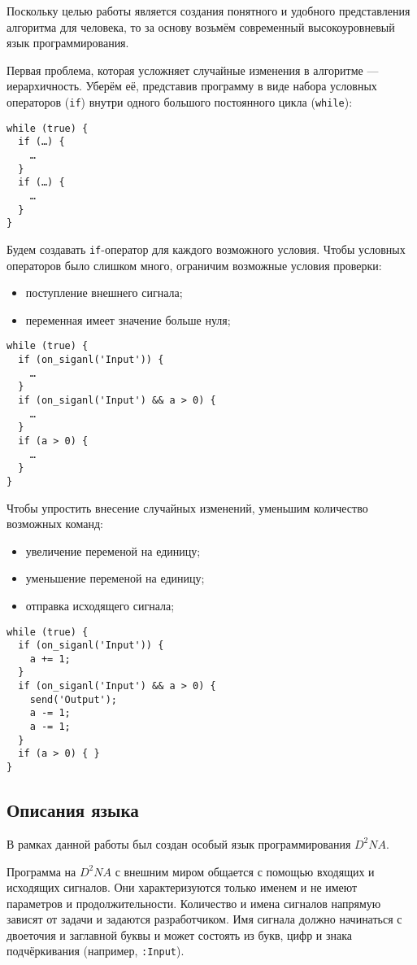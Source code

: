 \documentclass[utf8,a5paper,portrait,10pt,twoside]{eskdtext}
\begin{document}
Поскольку целью работы является создания понятного и удобного представления
алгоритма для человека, то за основу возьмём современный высокоуровневый язык
программирования.

Первая проблема, которая усложняет случайные изменения в алгоритме —
иерархичность. Уберём её, представив программу в виде набора
условных операторов (\texttt{if}) внутри одного большого постоянного цикла
(\texttt{while}):

\begin{verbatim}
while (true) {
  if (…) {
    …
  }
  if (…) {
    …
  }
}
\end{verbatim}

Будем создавать \texttt{if}-оператор для каждого возможного условия. Чтобы
условных операторов было слишком много, ограничим возможные условия проверки:
\begin{itemize}
  \item поступление внешнего сигнала;
  \item переменная имеет значение больше нуля;
\end{itemize}

\newpage
\begin{verbatim}
while (true) {
  if (on_siganl('Input')) {
    …
  }
  if (on_siganl('Input') && a > 0) {
    …
  }
  if (a > 0) {
    …
  }
}
\end{verbatim}

Чтобы упростить внесение случайных изменений, уменьшим количество возможных
команд:
\begin{itemize}
  \item увеличение переменой на единицу;
  \item уменьшение переменой на единицу;
  \item отправка исходящего сигнала;
\end{itemize}

\begin{verbatim}
while (true) {
  if (on_siganl('Input')) {
    a += 1;
  }
  if (on_siganl('Input') && a > 0) {
    send('Output');
    a -= 1;
    a -= 1;
  }
  if (a > 0) { }
}
\end{verbatim}

\subsection{Описания языка}

В рамках данной работы был создан особый язык программирования $D^2NA$.

Программа на $D^2NA$ с внешним миром общается с помощью входящих и исходящих
сигналов. Они характеризуются только именем и не имеют параметров и
продолжительности. Количество и имена сигналов напрямую зависят от задачи и
задаются разработчиком. Имя сигнала должно начинаться с двоеточия и заглавной
буквы и может состоять из букв, цифр и знака подчёркивания (например,
\texttt{:Input}).
\end{document}
